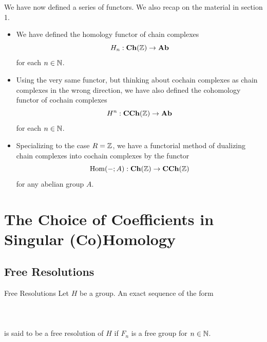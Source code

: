 \documentclass[a4paper]{article}
\begin{document}
We have now defined a series of functors. We also recap on the material in section 1. 
\begin{itemize}
\item We have defined the homology functor of chain complexes $$H_n:\bold{Ch}(\mathbb{Z})\to\bold{Ab}$$ for each $n\in\mathbb{N}$. 
\item Using the very same functor, but thinking about cochain complexes as chain complexes in the wrong direction, we have also defined the cohomology functor of cochain complexes $$H^n:\bold{CCh}(\mathbb{Z})\to\bold{Ab}$$ for each $n\in\mathbb{N}$. 
\item Specializing to the case $R=\mathbb{Z}$, we have a functorial method of dualizing chain complexes into cochain complexes by the functor $$\operatorname{Hom}(-;A):\bold{Ch}(\mathbb{Z})\to\bold{CCh}(\mathbb{Z})$$ for any abelian group $A$. 
\end{itemize}

\pagebreak
\section{The Choice of Coefficients in Singular (Co)Homology}
\subsection{Free Resolutions}
\begin{defn}{Free Resolutions}{} Let $H$ be a group. An exact sequence of the form \\~\\
\\~\\
is said to be a free resolution of $H$ if $F_n$ is a free group for $n\in\mathbb{N}$. 
\end{defn}
\end{document}
